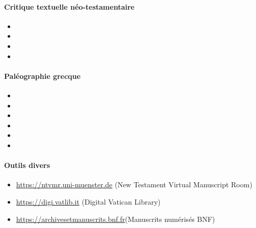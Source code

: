 \documentclass[a4, 12pt]{article}
\begin{document}
\paragraph{Critique textuelle néo-testamentaire}



\begin{itemize}
    \item {}
    \item {}
    \item {}
    \item {}
\end{itemize}

\paragraph{Paléographie grecque}

\begin{itemize}
    \item {}
    \item {}
    \item {}
    \item {}
    \item {}
    \item {}
\end{itemize}

\paragraph{Outils divers}
\begin{itemize}
    \item \url{https://ntvmr.uni-muenster.de} (New Testament Virtual Manuscript Room)
    \item \url{https://digi.vatlib.it} (Digital Vatican Library)
    \item \url{https://archivesetmanuscrits.bnf.fr}(Manuscrits numérisés BNF)
\end{itemize}
\end{document}
